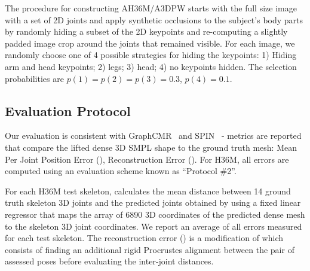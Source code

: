 The procedure for constructing AH36M/A3DPW starts with the full size image with a set of 2D joints and apply synthetic occlusions to the subject's body parts by randomly hiding a subset of the 2D keypoints and re-computing a slightly padded image crop around the joints that remained visible. 
For each image, we randomly choose one of 4 possible strategies for hiding the keypoints: 1) Hiding arm and head keypoints; 2) legs; 3) head; 4) no keypoints hidden. The selection probabilities are $p(1)=p(2)=p(3)=0.3$, $p(4)=0.1$.




\subsection{Evaluation Protocol}

Our evaluation is consistent with GraphCMR~\cite{kolotouros19learning} and SPIN~\cite{kolotouros19convolutional} - metrics are reported that compare the lifted dense 3D SMPL shape to the ground truth mesh: Mean Per Joint Position Error (\textbf{\MPJPE}), Reconstruction Error (\textbf{\RE}). 
For H36M, all errors are computed using an evaluation scheme known as ``Protocol \#2''. 

For each H36M test skeleton, \MPJPE calculates the mean distance between 14 ground truth skeleton 3D joints and the predicted joints obtained by using a fixed linear regressor that maps the array of 6890 3D coordinates of the predicted dense mesh to the skeleton 3D joint coordinates.
We report an average of all \MPJPE errors measured for each test skeleton.
The reconstruction error (\RE) is a modification of \MPJPE which consists of finding an additional rigid Procrustes alignment between the pair of assessed poses before evaluating the inter-joint distances.







